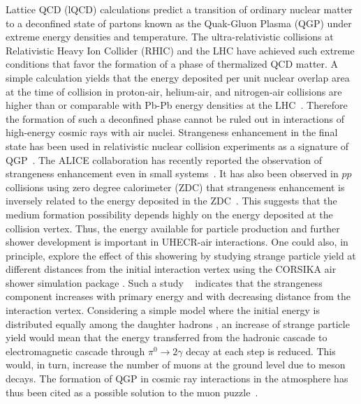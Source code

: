 \documentclass[aps,twocolumn,nofootinbib]{revtex4-1}
\begin{document}
Lattice QCD (lQCD) calculations \cite{Borsanyi:2010cj} predict a transition of ordinary nuclear matter to a deconfined state of partons known as the Quak-Gluon Plasma (QGP) under extreme energy densities and temperature. The ultra-relativistic collisions at Relativistic Heavy Ion Collider (RHIC) and the LHC have achieved such extreme conditions that favor the formation of a phase of thermalized QCD matter.
A simple calculation yields that the energy deposited per unit nuclear overlap area at the time of collision in proton-air, helium-air, and nitrogen-air collisions are higher than or comparable with Pb-Pb energy densities at the LHC~\cite{Anchordoqui:2019laz}. Therefore the formation of such a deconfined phase cannot be ruled out in interactions of high-energy cosmic rays with air nuclei. Strangeness enhancement in the final state has been used in relativistic nuclear collision experiments as a signature of QGP~\cite{Koch:2017pda,Rafelski:1982pu}. The ALICE collaboration has recently reported the observation of strangeness enhancement even in small systems~\cite{ALICE:2016fzo}. It has also been observed in $pp$ collisions using zero degree calorimeter (ZDC) that strangeness enhancement is inversely related to the energy deposited in the ZDC~\cite{Schotter:2023khz}. This suggests that the medium formation possibility depends highly on the energy deposited at the collision vertex. Thus, the energy available for particle production and further shower development
is important in UHECR-air interactions. One could also, in principle, explore the effect of this showering by studying strange particle yield at different distances from the initial interaction vertex using the CORSIKA air shower simulation package \cite{Heck:1998vt}. Such a study ~\cite{Scaria:2022ugk} indicates that the strangeness component increases with primary energy and with decreasing distance from the interaction vertex. Considering a simple model where the initial energy is distributed equally among the daughter hadrons \cite{Matthews:2005sd,Ulrich:2010rg}, an increase of strange particle yield would mean that the energy transferred from the hadronic cascade to electromagnetic cascade through $\pi^0\xrightarrow{} 2\gamma$ decay at each step is reduced. This would, in turn, increase the number of muons at the ground level due to meson decays. The formation of QGP in cosmic ray interactions in the atmosphere has thus been cited as a possible solution to the muon puzzle~\cite{Albrecht:2021cxw,Anchordoqui:2019laz,Petrukhin:2014lma}. \\
\end{document}
